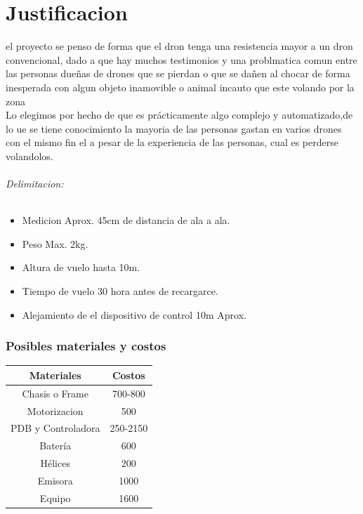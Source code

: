 \documentclass[11pt,a4paper]{article}
\begin{document}
\part{Justificacion}

el proyecto se penso de forma que el dron tenga una resistencia mayor a un dron convencional, dado a que hay muchos testimonios y una problmatica comun entre las personas dueñas de drones que se pierdan o que se dañen al chocar de forma inesperada con algun objeto inamovible o animal incauto que este volando por la zona   \\
Lo elegimos por hecho de que es prácticamente algo complejo y automatizado,de lo 	ue se tiene conocimiento la mayoria de las personas gastan en varios drones con el mismo fin el a pesar de la experiencia de las personas, cual es perderse volandolos. 

\paragraph{Delimitacion:}


\begin{itemize}
\item Medicion Aprox. 45cm de distancia de ala a ala.
\item Peso Max. 2kg.
\item Altura de vuelo hasta 10m.
\item Tiempo de vuelo 30 hora antes de recargarce.
\item Alejamiento de el dispositivo de control 10m Aprox.
\end{itemize} 

\section{Posibles materiales y costos}

\begin{tabular}{|c|c|}
\hline
\textbf{Materiales} & \textbf{Costos}\\ \hline
Chasis o Frame & 700-800 \\ \hline
Motorizacion & 500 \\ \hline
PDB y Controladora & 250-2150 \\ \hline
Batería & 600 \\ \hline
Hélices & 200 \\ \hline
Emisora & 1000 \\ \hline
Equipo & 1600 \\ \hline
\end{tabular}
\end{document}
